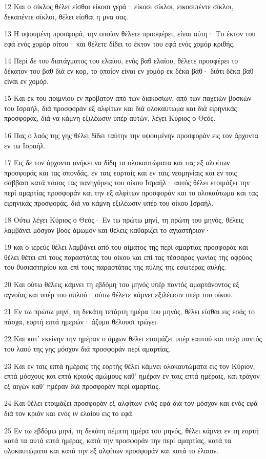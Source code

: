 \par 12 Και ο σίκλος θέλει είσθαι είκοσι γερά· είκοσι σίκλοι, εικοσιπέντε σίκλοι, δεκαπέντε σίκλοι, θέλει είσθαι η μνα σας.
\par 13 Η υψουμένη προσφορά, την οποίαν θέλετε προσφέρει, είναι αύτη· Το έκτον του εφά ενός χομόρ σίτου· και θέλετε δίδει το έκτον του εφά ενός χομόρ κριθής.
\par 14 Περί δε του διατάγματος του ελαίου, ενός βαθ ελαίου, θέλετε προσφέρει το δέκατον του βαθ διά εν κορ, το οποίον είναι εν χομόρ εκ δέκα βάθ· διότι δέκα βαθ είναι εν χομόρ.
\par 15 Και εκ του ποιμνίου εν πρόβατον από των διακοσίων, από των παχειών βοσκών του Ισραήλ, διά προσφοράν εξ αλφίτων και διά ολοκαύτωμα και διά ειρηνικάς προσφοράς, διά να κάμνη εξιλέωσιν υπέρ αυτών, λέγει Κύριος ο Θεός.
\par 16 Πας ο λαός της γης θέλει δίδει ταύτην την υψουμένην προσφοράν εις τον άρχοντα εν τω Ισραήλ.
\par 17 Εις δε τον άρχοντα ανήκει να δίδη τα ολοκαυτώματα και τας εξ αλφίτων προσφοράς και τας σπονδάς, εν ταις εορταίς και εν ταις νεομηνίαις και εν τοις σάββασι κατά πάσας τας πανηγύρεις του οίκου Ισραήλ· αυτός θέλει ετοιμάζει την περί αμαρτίας προσφοράν και την εξ αλφίτων προσφοράν και το ολοκαύτωμα και τας ειρηνικάς προσφοράς, διά να κάμνη εξιλέωσιν υπέρ του οίκου Ισραήλ.
\par 18 Ούτω λέγει Κύριος ο Θεός· Εν τω πρώτω μηνί, τη πρώτη του μηνός, θέλεις λαμβάνει μόσχον βοός άμωμον και θέλεις καθαρίζει το αγιαστήριον·
\par 19 και ο ιερεύς θέλει λαμβάνει από του αίματος της περί αμαρτίας προσφοράς και θέλει θέτει επί τους παραστάτας του οίκου και επί τας τέσσαρας γωνίας της οφρύος του θυσιαστηρίου και επί τους παραστάτας της πύλης της εσωτέρας αυλής.
\par 20 Και ούτω θέλεις κάμνει τη εβδόμη του μηνός υπέρ παντός αμαρτάνοντος εξ αγνοίας και υπέρ του απλού· ούτω θέλετε κάμνει εξιλέωσιν υπέρ του οίκου.
\par 21 Εν τω πρώτω μηνί, τη δεκάτη τετάρτη ημέρα του μηνός, θέλει είσθαι εις εσάς το πάσχα, εορτή επτά ημερών· άζυμα θέλουσι τρώγει.
\par 22 Και κατ' εκείνην την ημέραν ο άρχων θέλει ετοιμάζει υπέρ εαυτού και υπέρ παντός του λαού της γης μόσχον διά προσφοράν περί αμαρτίας.
\par 23 Και εν ταις επτά ημέραις της εορτής θέλει κάμνει ολοκαυτώματα εις τον Κύριον, επτά μόσχους και επτά κριούς αμώμους καθ' ημέραν εν ταις επτά ημέραις, και τράγον εξ αιγών καθ' ημέραν διά προσφοράν περί αμαρτίας.
\par 24 Και θέλει ετοιμάζει προσφοράν εξ αλφίτων ενός εφά διά τον μόσχον και ενός εφά διά τον κριόν και ενός ιν ελαίου εις το εφά.
\par 25 Εν τω εβδόμω μηνί, τη δεκάτη πέμπτη ημέρα του μηνός, θέλει κάμνει εν τη εορτή κατά τα αυτά επτά ημέρας, κατά την προσφοράν την περί αμαρτίας, κατά τα ολοκαυτώματα και κατά την εξ αλφίτων προσφοράν και κατά το έλαιον.

